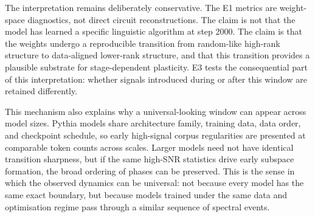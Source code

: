 The interpretation remains deliberately conservative. The E1 metrics are weight-space diagnostics, not direct circuit reconstructions. The claim is not that the model has learned a specific linguistic algorithm at step 2000. The claim is that the weights undergo a reproducible transition from random-like high-rank structure to data-aligned lower-rank structure, and that this transition provides a plausible substrate for stage-dependent plasticity. E3 tests the consequential part of this interpretation: whether signals introduced during or after this window are retained differently.

This mechanism also explains why a universal-looking window can appear across model sizes. Pythia models share architecture family, training data, data order, and checkpoint schedule, so early high-signal corpus regularities are presented at comparable token counts across scales. Larger models need not have identical transition sharpness, but if the same high-SNR statistics drive early subspace formation, the broad ordering of phases can be preserved. This is the sense in which the observed dynamics can be universal: not because every model has the same exact boundary, but because models trained under the same data and optimisation regime pass through a similar sequence of spectral events.
